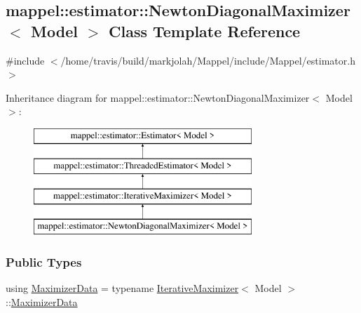 \hypertarget{classmappel_1_1estimator_1_1NewtonDiagonalMaximizer}{}\subsection{mappel\+:\+:estimator\+:\+:Newton\+Diagonal\+Maximizer$<$ Model $>$ Class Template Reference}
\label{classmappel_1_1estimator_1_1NewtonDiagonalMaximizer}


{\ttfamily \#include $<$/home/travis/build/markjolah/\+Mappel/include/\+Mappel/estimator.\+h$>$}

Inheritance diagram for mappel\+:\+:estimator\+:\+:Newton\+Diagonal\+Maximizer$<$ Model $>$\+:\begin{figure}[H]
\begin{center}
\leavevmode
\includegraphics[height=4.000000cm]{classmappel_1_1estimator_1_1NewtonDiagonalMaximizer}
\end{center}
\end{figure}
\subsubsection*{Public Types}
\begin{DoxyCompactItemize}
\item 
using \hyperlink{classmappel_1_1estimator_1_1NewtonDiagonalMaximizer_a57a1b340973904d7131560d66c4f3236}{Maximizer\+Data} = typename \hyperlink{classmappel_1_1estimator_1_1IterativeMaximizer}{Iterative\+Maximizer}$<$ Model $>$\+::\hyperlink{classmappel_1_1estimator_1_1NewtonDiagonalMaximizer_a57a1b340973904d7131560d66c4f3236}{Maximizer\+Data}
\end{DoxyCompactItemize}
